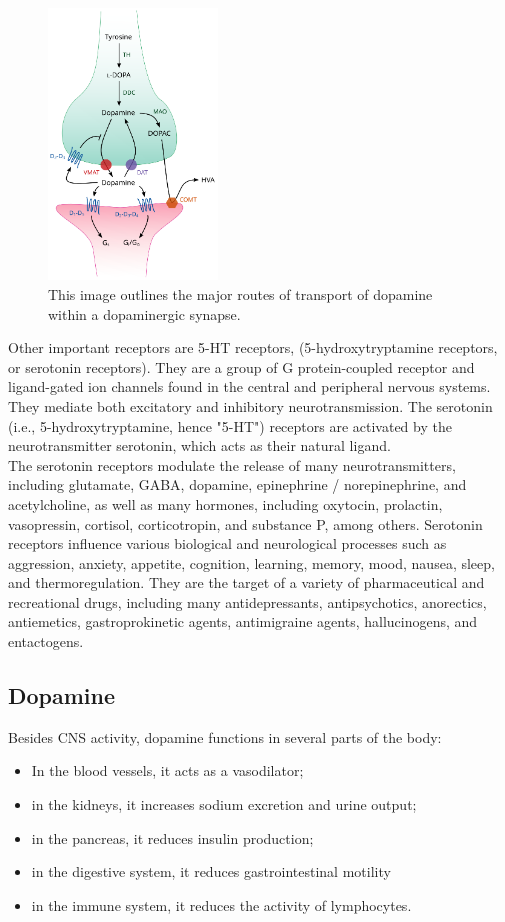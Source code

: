 \documentclass{book}
\begin{document}
\begin{figure}
    \centering
    \includegraphics[width=0.4\textwidth]{images3/image12.png}
    \caption{\label{fig:dopa}This image outlines the major routes of transport of dopamine within a dopaminergic synapse.}
\end{figure}

Other important receptors are 5-HT receptors, (5-hydroxytryptamine receptors, or serotonin receptors).
They are a group of G protein-coupled receptor and ligand-gated ion channels found in the central and peripheral nervous systems.
They mediate both excitatory and inhibitory neurotransmission.
The serotonin (i.e., 5-hydroxytryptamine, hence "5-HT") receptors are activated by the neurotransmitter serotonin, which acts as their natural ligand.
\\
The serotonin receptors modulate the release of many neurotransmitters, including glutamate, GABA, dopamine, epinephrine / norepinephrine, and acetylcholine, as well as many hormones, including oxytocin, prolactin, vasopressin, cortisol, corticotropin, and substance P, among others. 
Serotonin receptors influence various biological and neurological processes such as aggression, anxiety, appetite, cognition, learning, memory, mood, nausea, sleep, and thermoregulation. 
They are the target of a variety of pharmaceutical and recreational drugs, including many antidepressants, antipsychotics, anorectics, antiemetics, gastroprokinetic agents, antimigraine agents, hallucinogens, and entactogens.

\subsection{Dopamine}
Besides CNS activity, dopamine functions in several parts of the body:
\begin{itemize}
    \item In the blood vessels, it acts as a vasodilator;
    \item in the kidneys, it increases sodium excretion and urine output;
    \item in the pancreas, it reduces insulin production;
    \item in the digestive system, it reduces gastrointestinal motility
    \item in the immune system, it reduces the activity of lymphocytes.
\end{itemize}
\end{document}
